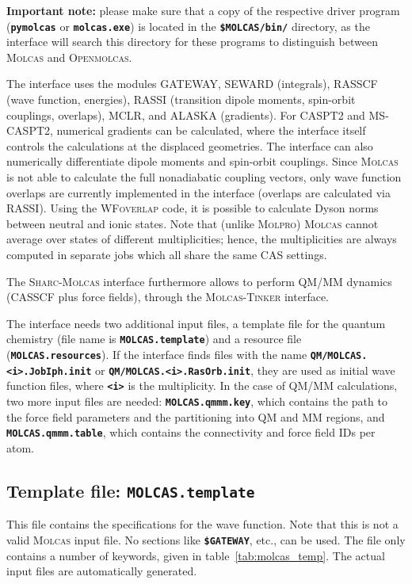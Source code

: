 \documentclass[a4paper,10pt,DIV=15,openany]{scrbook}
\newcommand{\sharc}{\textsc{Sharc}}
\newcommand{\ttt}[1]{\textbf{\texttt{#1}}}
\begin{document}
\textbf{Important note:} please make sure that a copy of the respective driver program (\ttt{pymolcas} or \ttt{molcas.exe}) is located in the \ttt{\$MOLCAS/bin/} directory, as the interface will search this directory for these programs to distinguish between \textsc{Molcas} and \textsc{Openmolcas}.

The interface uses the modules GATEWAY, SEWARD (integrals), RASSCF (wave function, energies), RASSI (transition dipole moments, spin-orbit couplings, overlaps), MCLR, and ALASKA (gradients). 
For CASPT2 and MS-CASPT2, numerical gradients can be calculated, where the interface itself controls the calculations at the displaced geometries. 
The interface can also numerically differentiate dipole moments and spin-orbit couplings.
Since \textsc{Molcas} is not able to calculate the full nonadiabatic coupling vectors, only wave function overlaps are currently implemented in the interface (overlaps are calculated via RASSI). 
Using the \textsc{WFoverlap} code, it is possible to calculate Dyson norms between neutral and ionic states.
Note that (unlike \textsc{Molpro}) \textsc{Molcas} cannot average over states of different multiplicities; hence, the multiplicities are always computed in separate jobs which all share the same CAS settings.

The \sharc-\textsc{Molcas} interface furthermore allows to perform QM/MM dynamics (CASSCF plus force fields), through the \textsc{Molcas}-\textsc{Tinker} interface. 

The interface needs two additional input files, a template file for the quantum chemistry (file name is \ttt{MOLCAS.template}) and a resource file (\ttt{MOLCAS.resources}). If the interface finds files with the name \ttt{QM/MOLCAS.<i>.JobIph.init} or \ttt{QM/MOLCAS.<i>.RasOrb.init}, they are used as initial wave function files, where \ttt{<i>} is the multiplicity. In the case of QM/MM calculations, two more input files are needed: \ttt{MOLCAS.qmmm.key}, which contains the path to the force field parameters and the partitioning into QM and MM regions, and \ttt{MOLCAS.qmmm.table}, which contains the connectivity and force field IDs per atom.

\subsection{Template file: \ttt{MOLCAS.template}}

This file contains the specifications for the wave function. Note that this is not a valid \textsc{Molcas} input file. No sections like \ttt{\$GATEWAY}, etc., can be used. The file only contains a number of keywords, given in table~\ref{tab:molcas_temp}.
The actual input files are automatically generated.
\end{document}
